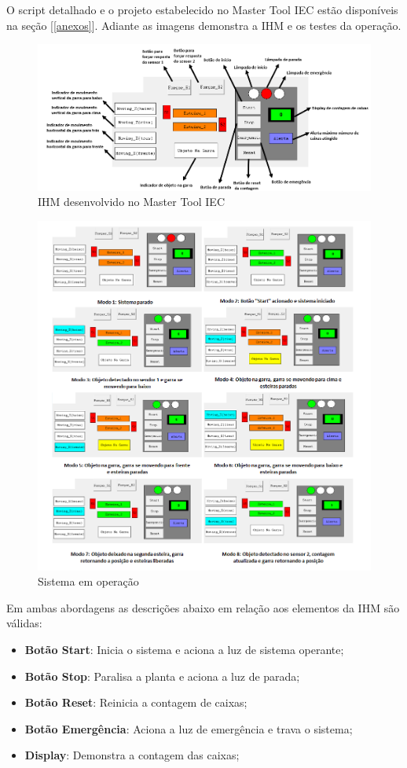\documentclass[
	12pt,				%
	openright,			%
	oneside,			%
	a4paper,			%
	english,			%
	brazil,				%
	]{abntex2}
\begin{document}
O script detalhado e o projeto estabelecido no Master Tool IEC estão disponíveis na seção [\ref{anexos}]. Adiante as imagens demonstra a IHM e os testes da operação.

\begin{figure}[H]
\centering
\includegraphics[width=1\linewidth]{Imagens/i7.PNG}
\caption{IHM desenvolvido no Master Tool IEC}
\label{fig:ihm_2}
\end{figure}

\begin{figure}[H]
\centering
\includegraphics[width=1\linewidth]{Imagens/i8.png}
\caption{Sistema em operação}
\label{fig:sis}
\end{figure}

Em ambas abordagens as descrições abaixo em relação aos elementos da IHM são válidas:
\begin{itemize}
    \item \textbf{Botão Start}: Inicia o sistema e aciona a luz de sistema operante;
    \item \textbf{Botão Stop}: Paralisa a planta e aciona a luz de parada;
    \item \textbf{Botão Reset}: Reinicia a contagem de caixas;
    \item \textbf{Botão Emergência}: Aciona a luz de emergência e trava o sistema;
    \item \textbf{Display}: Demonstra a contagem das caixas;
\end{itemize}
\end{document}
